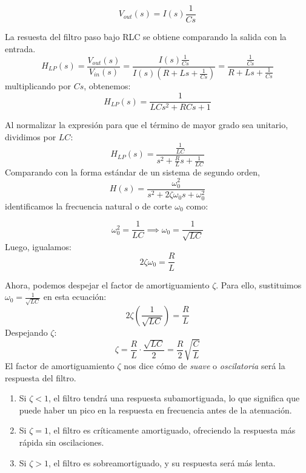 \begin{equation}\label{eq:vout_condensador}
    V_{out}(s) = I(s)\frac{1}{Cs} 
\end{equation}

La resuesta del filtro paso bajo RLC se obtiene comparando la salida con la entrada. 
\begin{equation}
    H_{LP}(s) = \dfrac{V_{out}(s)}{V_{in}(s)} = \dfrac{I(s)\frac{1}{Cs}}{I(s)(R + Ls + \frac{1}{Cs})} = \dfrac{\frac{1}{Cs}}{R + Ls + \frac{1}{Cs}}
\end{equation}
multiplicando por $Cs$, obtenemos:
\begin{equation}\label{eq:tf_rlc_intermedia}
    H_{LP}(s) = \frac{1}{LCs^2 + RCs + 1} 
\end{equation}

Al normalizar la expresión para que el término de mayor grado sea unitario, dividimos por $LC$:
\begin{equation}
    H_{LP}(s) = \frac{\frac{1}{LC}}{s^2 + \frac{R}{L}s + \frac{1}{LC}}
\end{equation}
%
Comparando con la forma estándar de un sistema de segundo orden, 
\begin{equation}\label{eq:tf_rlc_final}
    H(s) = \dfrac{\omega_0^2}{s^2 + 2\zeta\omega_0s + \omega_0^2}
\end{equation} 
identificamos la frecuencia natural o de corte $\omega_0$ como:


\begin{equation}
    \omega_0^2 = \frac{1}{LC} \implies \omega_0 = \frac{1}{\sqrt{LC}}
\end{equation}
%
Luego, igualamos: 
\begin{equation}
2\zeta\omega_0 = \frac{R}{L}   
\end{equation}

Ahora, podemos despejar el factor de amortiguamiento $\zeta$. Para ello, sustituimos $\omega_0 = \frac{1}{\sqrt{LC}}$ en esta ecuación:
\begin{equation}
2\zeta \left(\frac{1}{\sqrt{LC}}\right) = \frac{R}{L} 
\end{equation} 
Despejando $\zeta$: 
\begin{equation} 
\zeta = \frac{R}{L} \cdot \frac{\sqrt{LC}}{2} = \frac{R}{2} \sqrt{\frac{C}{L}} 
\end{equation} 
El factor de amortiguamiento $\zeta$ nos dice cómo de \emph{suave} o \emph{oscilatoria} será la respuesta del filtro.

\begin{enumerate}
    \item Si $\zeta < 1$, el filtro tendrá una respuesta subamortiguada, lo que significa que puede haber un pico en la respuesta en frecuencia antes de la atenuación.
    \item Si $\zeta = 1$, el filtro es críticamente amortiguado, ofreciendo la respuesta más rápida sin oscilaciones.
    \item Si $\zeta > 1$, el filtro es sobreamortiguado, y su respuesta será más lenta.
\end{enumerate}

